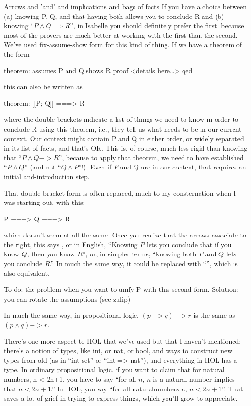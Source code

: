Arrows and 'and' and implications and bags of facts
If you have a choice between (a) knowing P, Q, and that having both allows you to conclude R and (b) knowing ``$P  \wedge  Q \implies R$'', in Isabelle you should definitely prefer the first, because most of the provers are much better at working with the first than the second. We've used fix-assume-show form for this kind of thing. If we have a theorem of the form

\begin{IS}
theorem:
   assumes P and Q   
   shows R
proof <details here\ldots > qed
\end{IS}


this can also be written as 
\begin{IS}
theorem:
   [[P; Q]] ===> R
\end{IS}

where the double-brackets indicate a list of things we need to know in order to conclude R using this theorem, i.e., they tell us what needs to be in our current context. Our context might contain P and Q in either order, or widely separated in its list of facts, and that's OK. This is, of course, much less rigid than knowing that ``$P  \wedge  Q -> R$'', because to apply that theorem, we need to have established ``$P  \wedge  Q$'' (and not ``$Q  \wedge  P$''!). Even if $P$ and $Q$ are in our context, that requires an initial and-introduction step. 

That double-bracket form is often replaced, much to my consternation when I was starting out, with this: 

\begin{IS}
    P ===> Q ===> R

\end{IS}
which doesn't seem at all the same. Once you realize that the arrows associate to the right, this says , or in English, ``Knowing $P$ lets you conclude that if you know $Q$, then you know $R$'', or, in simpler terms, ``knowing both $P$ and $Q$ lets you conclude $R$.'' In much the same way, it could be replaced with ``'', which is also equivalent. 

To do: the problem when you want to unify P with this second form. Solution: you can rotate the assumptions (see zulip)

In much the same way, in propositional logic, $(p -> q) -> r$ is the same as $(p  \wedge  q) -> r$.

There's one more aspect to HOL that we've used but that I haven't mentioned: there's a notion of types, like int, or nat, or bool, and ways to construct new types from old (as in ``int set'' or ``int => nat''), and everything in HOL has a type. In ordinary propositional logic, if you want to claim that for natural numbers, n < 2n+1, you have to say ``for all $n$,  $n$ is a natural number implies that  $n < 2n + 1$.'' In HOL, you say ``for all naturalnumbers $n$, $n < 2n + 1$''. That saves a lot of grief in trying to express things, which you'll grow to appreciate. 

